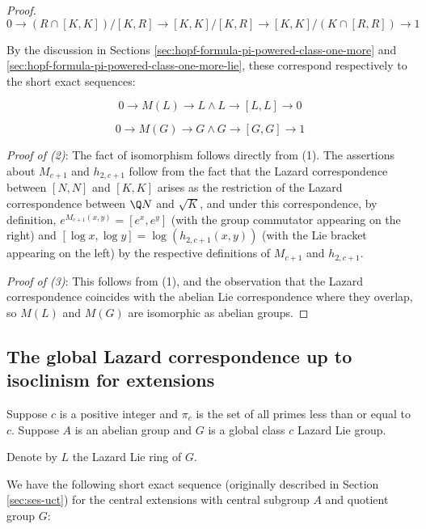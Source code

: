 \documentclass{ucetd}
\begin{document}
\begin{proof}
  $$0 \to (R \cap [K,K])/[K,R] \to [K,K]/[K,R] \to [K,K]/(K \cap [R,R]) \to 1$$

  By the discussion in Sections
  \ref{sec:hopf-formula-pi-powered-class-one-more} and
  \ref{sec:hopf-formula-pi-powered-class-one-more-lie}, these
  correspond respectively to the short exact sequences:

  $$0 \to M(L) \to L \wedge L \to [L,L] \to 0$$

  $$0 \to M(G) \to G \wedge G \to [G,G] \to 1$$

  {\em Proof of (2)}: The fact of isomorphism follows directly from
  (1). The assertions about $M_{c+1}$ and $h_{2,c+1}$ follow from the
  fact that the Lazard correspondence between $[N,N]$ and $[K,K]$
  arises as the restriction of the Lazard correspondence between $\Q
  N$ and $\sqrt{K}$, and under this correspondence, by definition,
  $e^{M_{c+1}(x,y)} = [e^x,e^y]$ (with the group commutator appearing
  on the right) and $[\log x,\log y] = \log(h_{2,c+1}(x,y))$ (with the
  Lie bracket appearing on the left) by the respective definitions of
  $M_{c+1}$ and $h_{2,c+1}$.

  {\em Proof of (3)}: This follows from (1), and the observation that
  the Lazard correspondence coincides with the abelian Lie
  correspondence where they overlap, so $M(L)$ and $M(G)$ are
  isomorphic as abelian groups.
\end{proof}



\subsection{The global Lazard correspondence up to isoclinism for extensions}\label{sec:glcuti-extensions}

Suppose $c$ is a positive integer and $\pi_c$ is the set of all primes
less than or equal to $c$. Suppose $A$ is an abelian group and $G$ is
a global class $c$ Lazard Lie group.

Denote by $L$ the Lazard Lie ring of $G$.

We have the following short exact sequence (originally described in
Section \ref{sec:ses-uct}) for the central extensions with central
subgroup $A$ and quotient group $G$:
\end{document}
